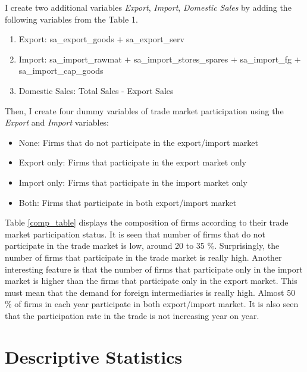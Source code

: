 \documentclass[11pt]{article}
\begin{document}
I create two additional variables \textit{Export}, \textit{Import},
\textit{Domestic Sales}
by adding the following variables from the Table 1.  
\begin{enumerate}
\item Export: sa\_export\_goods $+$ sa\_export\_serv
\item Import: sa\_import\_rawmat $+$        sa\_import\_stores\_spares
  $+$ sa\_import\_fg            $+$sa\_import\_cap\_goods
\item Domestic Sales: Total Sales - Export Sales
\end{enumerate}
Then, I create four dummy variables of trade market participation
using the \textit{Export} and \textit{Import} variables: 
\begin{itemize}
\item None: Firms that do not participate in the export/import market
\item Export only: Firms that participate in the export market only
\item Import only: Firms that participate in the import market only
\item Both: Firms that participate in both export/import market
\end{itemize}
Table \ref{comp_table} displays the composition of firms according to their trade market
participation status. It is seen that number of firms that do not
participate in the trade market is low,  around 20 to 35
\%. Surprisingly, the number of firms that participate in the trade
market is really high. Another interesting feature is that the number
of firms that participate only in the import market is higher than the
firms that participate only in the export market. This must mean that
the demand for foreign intermediaries is really high. Almost 50 \% of
firms in each year participate in both export/import market.  It is
also seen that the participation rate in the trade is not increasing
year on year.  
\begin{center}

\end{center}
\section{Descriptive Statistics}
\end{document}
